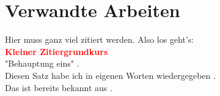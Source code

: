 \chapter{Verwandte Arbeiten}
\label{ch:relatedwork} %

\par
Hier muss ganz viel zitiert werden. Also los geht's:\\
\textbf{\textcolor{red}{Kleiner Zitiergrundkurs}}\\


"Behauptung eins" \cite[Abs. 3]{Manning2009} .\\
Diesen Satz habe ich in eigenen Worten wiedergegeben \cite{Breiman2001}.\\
Das ist bereits bekannt aus \cite[S.155-161]{Schultz1968}.




